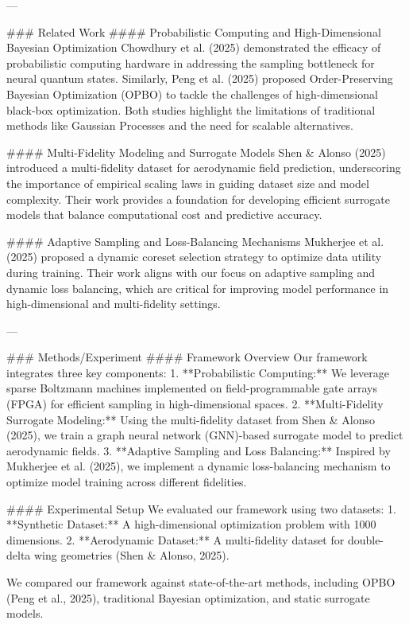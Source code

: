 ---

### Related Work  
#### Probabilistic Computing and High-Dimensional Bayesian Optimization  
Chowdhury et al. (2025) demonstrated the efficacy of probabilistic computing hardware in addressing the sampling bottleneck for neural quantum states. Similarly, Peng et al. (2025) proposed Order-Preserving Bayesian Optimization (OPBO) to tackle the challenges of high-dimensional black-box optimization. Both studies highlight the limitations of traditional methods like Gaussian Processes and the need for scalable alternatives.

#### Multi-Fidelity Modeling and Surrogate Models  
Shen & Alonso (2025) introduced a multi-fidelity dataset for aerodynamic field prediction, underscoring the importance of empirical scaling laws in guiding dataset size and model complexity. Their work provides a foundation for developing efficient surrogate models that balance computational cost and predictive accuracy.

#### Adaptive Sampling and Loss-Balancing Mechanisms  
Mukherjee et al. (2025) proposed a dynamic coreset selection strategy to optimize data utility during training. Their work aligns with our focus on adaptive sampling and dynamic loss balancing, which are critical for improving model performance in high-dimensional and multi-fidelity settings.

---

### Methods/Experiment  
#### Framework Overview  
Our framework integrates three key components:  
1. **Probabilistic Computing:** We leverage sparse Boltzmann machines implemented on field-programmable gate arrays (FPGA) for efficient sampling in high-dimensional spaces.  
2. **Multi-Fidelity Surrogate Modeling:** Using the multi-fidelity dataset from Shen & Alonso (2025), we train a graph neural network (GNN)-based surrogate model to predict aerodynamic fields.  
3. **Adaptive Sampling and Loss Balancing:** Inspired by Mukherjee et al. (2025), we implement a dynamic loss-balancing mechanism to optimize model training across different fidelities.

#### Experimental Setup  
We evaluated our framework using two datasets:  
1. **Synthetic Dataset:** A high-dimensional optimization problem with 1000 dimensions.  
2. **Aerodynamic Dataset:** A multi-fidelity dataset for double-delta wing geometries (Shen & Alonso, 2025).  

We compared our framework against state-of-the-art methods, including OPBO (Peng et al., 2025), traditional Bayesian optimization, and static surrogate models.

